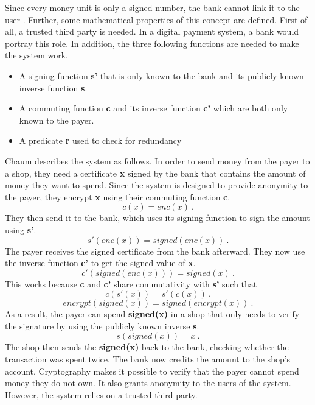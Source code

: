 Since every money unit is only a signed number, the bank cannot link it to the user \cite{pointcheval2000}.
Further, some mathematical properties of this concept are defined.
First of all, a trusted third party is needed.
In a digital payment system, a bank would portray this role.
In addition, the three following functions are needed to make the system work.
\begin{itemize}
    \item A signing function \textbf{s'} that is only known to the bank and its publicly known inverse function \textbf{s}.
    \item A commuting function \textbf{c} and its inverse function \textbf{c'} which are both only known to the payer.
    \item A predicate \textbf{r} used to check for redundancy
\end{itemize}
Chaum describes the system as follows.
In order to send money from the payer to a shop, they need a certificate \textbf{x} signed by the bank that contains the amount of money they want to spend.
Since the system is designed to provide anonymity to the payer, they encrypt \textbf{x} using their commuting function \textbf{c}.
\begin{equation}
    c\left(x\right) = enc\left(x\right)~.
\end{equation}
They then send it to the bank, which uses its signing function to sign the amount using \textbf{s'}.
\begin{equation}
    s'\left(enc\left(x\right)\right) = signed\left(enc\left(x\right)\right)~.
\end{equation}
The payer receives the signed certificate from the bank afterward. They now use the inverse function \textbf{c'} to get the signed value of \textbf{x}.
\begin{equation}
    c'\left(signed\left(enc\left(x\right)\right)\right) = signed\left(x\right)~.
\end{equation}
This works because \textbf{c} and \textbf{c'} share commutativity with \textbf{s'} such that
\begin{equation}
    c\left( s'\left(x\right) \right) = s'\left( c\left(x\right) \right) ~.
\end{equation}
\begin{equation}
    encrypt\left( signed\left(x\right) \right) = signed\left( encrypt\left(x\right) \right) ~.
\end{equation}
As a result, the payer can spend \textbf{signed(x)} in a shop that only needs to verify the signature by using the publicly known inverse \textbf{s}.
\begin{equation}
    s\left( signed\left(x\right) \right) = x ~.
\end{equation}
The shop then sends the \textbf{signed(x)} back to the bank, checking whether the transaction was spent twice.
The bank now credits the amount to the shop's account.
Cryptography makes it possible to verify that the payer cannot spend money they do not own.
It also grants anonymity to the users of the system.
However, the system relies on a trusted third party. \cite{chaum1983}

